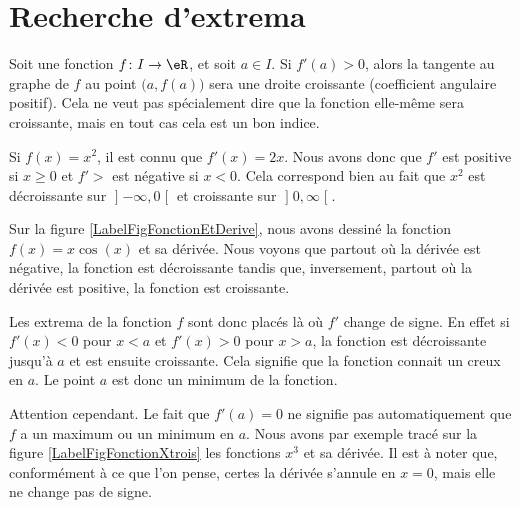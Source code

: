 \section{Recherche d'extrema}

Soit une fonction $f\colon I\to \eR$, et soit $a\in I$. Si $f'(a)>0$, alors la tangente au graphe de $f$ au point $\big( a,f(a) \big)$ sera une droite croissante (coefficient angulaire positif). Cela ne veut pas spécialement dire que la fonction elle-même sera croissante, mais en tout cas cela est un bon indice.

\begin{example}
	Si $f(x)=x^2$, il est connu que $f'(x)=2x$. Nous avons donc que $f'$ est positive si $x\geq 0$ et $f'>$ est négative si $x<0$. Cela correspond bien au fait que $x^2$ est décroissante sur $\mathopen] -\infty , 0 \mathclose[$ et croissante sur $\mathopen] 0 , \infty \mathclose[$.
\end{example}
 
Sur la figure \ref{LabelFigFonctionEtDerive}, nous avons dessiné la fonction $f(x)=x\cos(x)$ et sa dérivée. Nous voyons que partout où la dérivée est négative, la fonction est décroissante tandis que, inversement, partout où la dérivée est positive, la fonction est croissante.
\newcommand{\CaptionFigFonctionEtDerive}{La fonction $f(x)=x\cos(x)$ en bleu et sa dérivée en rouge.}


Les extrema de la fonction $f$ sont donc placés là où $f'$ change de signe. En effet si $f'(x)<0$ pour $x<a$ et $f'(x)>0$ pour $x>a$, la fonction est décroissante jusqu'à $a$ et est ensuite croissante. Cela signifie que la fonction connait un creux en $a$. Le point $a$ est donc un minimum de la fonction.

Attention cependant. Le fait que $f'(a)=0$ ne signifie pas automatiquement que $f$ a un maximum ou un minimum en $a$. Nous avons par exemple tracé sur la figure \ref{LabelFigFonctionXtrois} les fonctions $x^3$ et sa dérivée. Il est à noter que, conformément à ce que l'on pense, certes la dérivée s'annule en $x=0$, mais elle ne change pas de signe.
\newcommand{\CaptionFigFonctionXtrois}{La dérivée de $x^3$ s'annule en $x=0$, mais ce n'est ni un minimum ni un maximum.}



